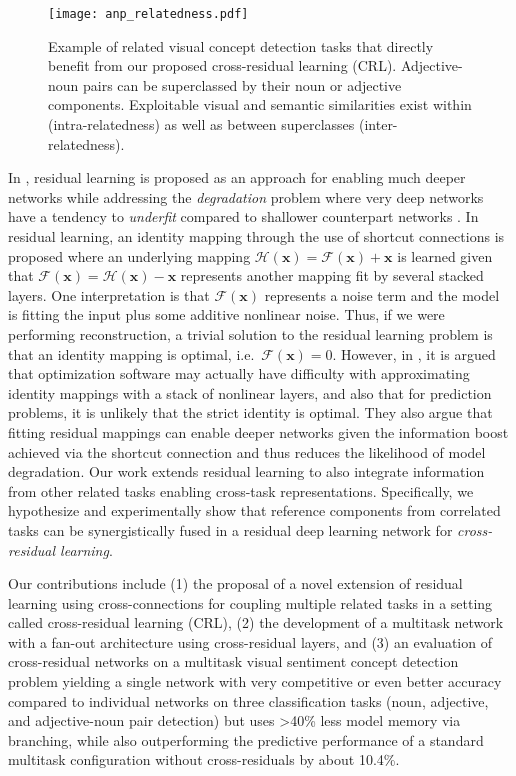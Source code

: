 \documentclass{sig-alternate-05-2015}
\newcommand{\mb}{\mathbf}
\begin{document}
\begin{figure}[t]
  \centering
  \texttt{[image: anp\_relatedness.pdf]}
  \caption{Example of related visual concept detection tasks that directly benefit from our proposed cross-residual learning (CRL). Adjective-noun pairs can be superclassed by their noun or adjective components. Exploitable visual and semantic similarities exist within (intra-relatedness) as well as between superclasses (inter-relatedness).}
  \label{fig:anp_relatedness}
  \vspace{-0.3cm}
\end{figure}

In \cite{he_2016}, residual learning is proposed as an approach for enabling much deeper networks while addressing the \emph{degradation} problem where very deep networks have a tendency to \emph{underfit} compared to shallower counterpart networks \cite{srivastava_2015}.
In residual learning, an identity mapping through the use of shortcut connections \cite{raiko_2012} is proposed where an underlying mapping $\mathcal{H}(\mb x) = \mathcal{F}(\mb x) + \mb x$ is learned given that $\mathcal{F}(\mb x) = \mathcal{H}(\mb x) - \mb x$ represents another mapping fit by several stacked layers.
One interpretation is that $\mathcal{F}(\mb x)$ represents a noise term and the model is fitting the input plus some additive nonlinear noise.
Thus, if we were performing reconstruction, a trivial solution to the residual learning problem is that an identity mapping is optimal, i.e.~$\mathcal{F}(\mb x) = 0$.
However, in \cite{he_2016}, it is argued that optimization software may actually have difficulty with approximating identity mappings with a stack of nonlinear layers, and also that for prediction problems, it is unlikely that the strict identity is optimal.
They also argue that fitting residual mappings can enable deeper networks given the information boost achieved via the shortcut connection and thus reduces the likelihood of model degradation.
Our work extends residual learning \cite{he_2016} to also integrate information from other related tasks enabling cross-task representations.
Specifically, we hypothesize and experimentally show that reference components from correlated tasks can be synergistically fused in a residual deep learning network for \emph{cross-residual learning}.

Our contributions include
(1) the proposal of a novel extension of residual learning \cite{he_2016} using cross-connections for coupling multiple related tasks in a setting called cross-residual learning (CRL),
(2) the development of a multitask network with a fan-out architecture using cross-residual layers, and
(3) an evaluation of cross-residual networks on a multitask visual sentiment concept detection problem yielding a single network with very competitive or even better accuracy compared to individual networks on three classification tasks (noun, adjective, and adjective-noun pair detection) but uses >40\% less model memory via branching, while also outperforming the predictive performance of a standard multitask configuration without cross-residuals by about 10.4\%.
\end{document}
